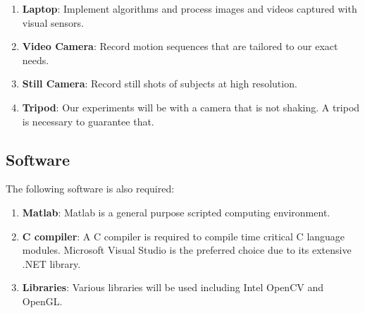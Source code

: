 \documentclass[12pt,letterpaper,doublespaced,ETD,proposal]{gt-ece-thesis}
\begin{document}
\begin{Body}
\begin{enumerate}
\item \textbf{Laptop}: Implement algorithms and process images and videos captured with visual sensors.

\item \textbf{Video Camera}: Record motion sequences that are tailored to our exact needs. 

\item \textbf{Still Camera}: Record still shots of subjects at high resolution.  

\item \textbf{Tripod}:  Our experiments will be with a camera that is not shaking.  A tripod is necessary to guarantee that.
\end{enumerate}

\subsection{Software}
The following software is also required:

\begin{enumerate}
\item \textbf{Matlab}: Matlab is a general purpose scripted computing environment. 
\item \textbf{C compiler}:  A C compiler is required to compile time critical C language modules.  Microsoft Visual Studio is the preferred choice due to its extensive .NET library.
\item \textbf{Libraries}: Various libraries will be used including Intel OpenCV and OpenGL.
\end{enumerate}











\end{Body}
\begin{EndMatter}
\end{EndMatter}
\end{document}
